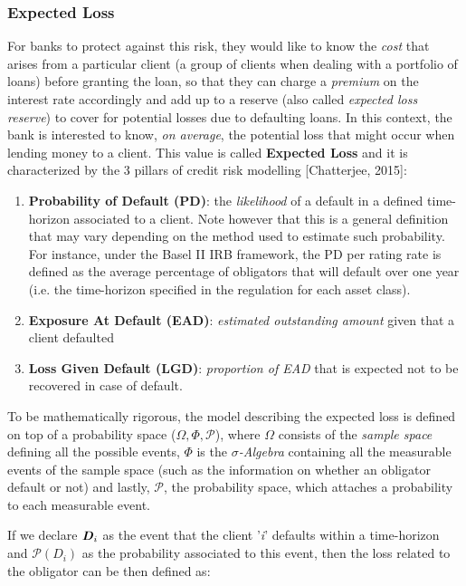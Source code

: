 \documentclass[a4paper,12pt]{article}
\begin{document}
    \subsubsection{Expected Loss}
    For banks to protect against this risk, they would like to know the \textit{cost} 
    that arises from a particular client (a group of clients when dealing with a portfolio of loans) 
    before granting the loan, so that they can charge a \textit{premium} on the interest rate accordingly 
    and add up to a reserve (also called \textit{expected loss reserve}) to cover for potential losses 
    due to defaulting loans.
    In this context, the bank is interested to know, \textit{on average}, 
    the potential loss that might occur when lending money to a client.
    This value is called \textbf{Expected Loss} and it is characterized 
    by the 3 pillars of credit risk modelling [Chatterjee, 2015]:

        \begin{enumerate} \item \textbf{Probability of Default (PD)}: the \textit{likelihood} of a default in a defined time-horizon associated to a client. Note however that this is a general definition that may vary depending on the method used to estimate such probability. For instance, under the Basel II IRB framework, the PD per rating rate is defined as the average percentage of obligators that will default over one year (i.e. the time-horizon specified in the regulation for each asset class). \item \textbf{Exposure At Default (EAD)}: \textit{estimated outstanding amount} given that a client defaulted \item \textbf{Loss Given Default (LGD)}: \textit{proportion of EAD} that is expected not to be recovered in case of default.
        \end{enumerate}

    To be mathematically rigorous, the model describing the expected loss is defined on top of a probability space ($\Omega,\Phi,\mathcal{P}$), where $\Omega$ consists of the \textit{sample space} defining all the possible events, 
    $\Phi$ is the \textit{$\sigma$-Algebra} containing all the measurable events of the sample space (such as the information on whether an obligator default or not) and lastly, 
    $\mathcal{P}$, the probability space, which attaches a probability to each measurable event.

    If we declare $\textbf{\textit{D}}_{i}$ as the event that the client '\textit{i}' defaults within a time-horizon and $\mathcal{P}(D_{i})$ as the probability associated to this event, then 
    the loss related to the obligator can be then defined as:
    
\end{document}
